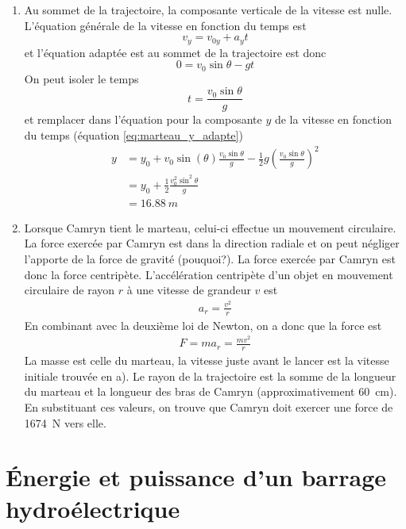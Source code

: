 \documentclass[nofonts]{tufte-handout}
\begin{document}
\begin{enumerate}[label=\alph*)]
  \item Au sommet de la trajectoire, la composante verticale de la vitesse est
    nulle. L'équation générale de la vitesse en fonction du temps est
    \begin{equation}
      v_y = v_{0y} + a_y t
    \end{equation}
    et l'équation adaptée est au sommet de la trajectoire est donc
    \begin{equation}
      0 = v_{0}\sin\theta - g t
    \end{equation}
    On peut isoler le temps
    \begin{equation}
      t = \frac{v_{0}\sin\theta}{g}
    \end{equation}
    et remplacer dans l'équation pour la composante $y$ de la vitesse en
    fonction du temps (équation \ref{eq:marteau_y_adapte})
    \begin{align}
      y &= y_0 + v_{0}\sin(\theta) \frac{v_{0}\sin\theta}{g} - \frac{1}{2} g
      \left(\frac{v_{0}\sin\theta}{g}\right)^2  \\
        &= y_0 + \frac{1}{2} \frac{v_{0}^2\sin^2\theta}{g}  \\
        &= \qty{16.88}{m}  \nonumber
    \end{align}

  \item Lorsque Camryn tient le marteau, celui-ci effectue un mouvement
    circulaire. La force exercée par Camryn est dans la direction radiale et on
    peut négliger l'apporte de la force de gravité (pouquoi?). La force exercée
    par Camryn est donc la force centripète. L'accélération centripète d'un
    objet en mouvement circulaire de rayon $r$ à une vitesse de grandeur $v$ est
    \begin{align}
      a_r = \frac{v^2}{r}
    \end{align}
    En combinant avec la deuxième loi de Newton, on a donc que la force est
    \begin{align}
      F = ma_r = \frac{mv^2}{r}
    \end{align}
    La masse est celle du marteau, la vitesse juste avant le lancer est la
    vitesse initiale trouvée en a). Le rayon de la trajectoire est la somme de
    la longueur du marteau et la longueur des bras de Camryn (approximativement
    \qty{60}{cm}). En substituant ces valeurs, on trouve que Camryn doit exercer
    une force de \qty{1674}{N} vers elle.
\end{enumerate}
\fi


\section{Énergie et puissance d'un barrage hydroélectrique}
\end{document}
